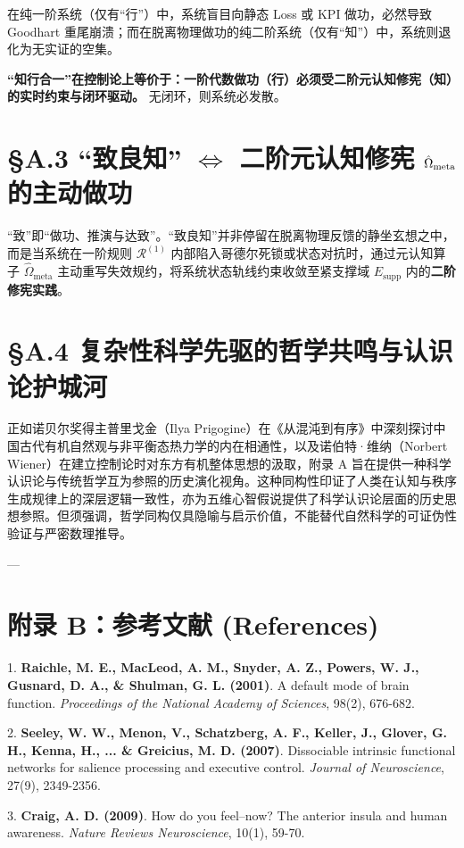 \documentclass[11pt,a4paper,oneside]{ctexart}
\begin{document}
在纯一阶系统（仅有“行”）中，系统盲目向静态 Loss 或 KPI 做功，必然导致 Goodhart 重尾崩溃；而在脱离物理做功的纯二阶系统（仅有“知”）中，系统则退化为无实证的空集。

\textbf{“知行合一”在控制论上等价于：一阶代数做功（行）必须受二阶元认知修宪（知）的实时约束与闭环驱动。} 无闭环，则系统必发散。


\section{§A.3 “致良知” $\Longleftrightarrow$ 二阶元认知修宪 $\protect\hat{\Omega}_{\text{meta}}$ 的主动做功}
“致”即“做功、推演与达致”。“致良知”并非停留在脱离物理反馈的静坐玄想之中，而是当系统在一阶规则 $\mathcal{R}^{(1)}$ 内部陷入哥德尔死锁或状态对抗时，通过元认知算子 $\hat{\Omega}_{\text{meta}}$ 主动重写失效规约，将系统状态轨线约束收敛至紧支撑域 $E_{\text{supp}}$ 内的\textbf{二阶修宪实践}。


\section{§A.4 复杂性科学先驱的哲学共鸣与认识论护城河}
正如诺贝尔奖得主普里戈金（Ilya Prigogine）在《从混沌到有序》中深刻探讨中国古代有机自然观与非平衡态热力学的内在相通性，以及诺伯特·维纳（Norbert Wiener）在建立控制论时对东方有机整体思想的汲取，附录 A 旨在提供一种科学认识论与传统哲学互为参照的历史演化视角。这种同构性印证了人类在认知与秩序生成规律上的深层逻辑一致性，亦为五维心智假说提供了科学认识论层面的历史思想参照。但须强调，哲学同构仅具隐喻与启示价值，不能替代自然科学的可证伪性验证与严密数理推导。


---


\section{附录 B：参考文献 (References)}

1. \textbf{Raichle, M. E., MacLeod, A. M., Snyder, A. Z., Powers, W. J., Gusnard, D. A., \& Shulman, G. L. (2001)}. A default mode of brain function. \textit{Proceedings of the National Academy of Sciences}, 98(2), 676-682.

2. \textbf{Seeley, W. W., Menon, V., Schatzberg, A. F., Keller, J., Glover, G. H., Kenna, H., ... \& Greicius, M. D. (2007)}. Dissociable intrinsic functional networks for salience processing and executive control. \textit{Journal of Neuroscience}, 27(9), 2349-2356.

3. \textbf{Craig, A. D. (2009)}. How do you feel--now? The anterior insula and human awareness. \textit{Nature Reviews Neuroscience}, 10(1), 59-70.
\end{document}
